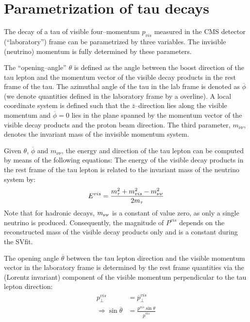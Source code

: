 \section{Parametrization of tau decays}
\label{sec:svParameterization}

The decay of a tau of visible four--momentum $p_{vis}$ measured in the CMS
detector (``laboratory'') frame can be parametrized by three variables.  The
invisible (neutrino) momentum is fully determined by these parameters.

The ``opening--angle'' $\theta$ is defined as the angle between the boost
direction of the tau lepton and the momentum vector of the visible decay
products in the rest frame of the tau.  The azimuthal angle of the tau in the
lab frame is denoted as $\overline{\phi}$ (we denote quantities defined in the
laboratory frame by a overline).  A local coordinate system is defined such that the
$\bar{z}$--direction lies along the visible momentum and $\overline{\phi} = 0$ lies
in the plane spanned by the momentum vector of the visible decay products and
the proton beam direction. The third parameter, $m_{\nu\nu}$, denotes the
invariant mass of the invisible momentum system.

Given $\theta$, $\overline{\phi}$ and $m_{\nu\nu}$, the energy and direction of the
tau lepton can be computed by means of the following equations: The energy of
the visible decay products in the rest frame of the tau lepton is related to the
invariant mass of the neutrino system by:
\begin{equation}
E^{vis} = \frac{m_\tau^2 + m_{vis}^2 - m_{\nu\nu}^2}{2m_\tau} 
\label{eq:restFrameMomentumRelation}
\end{equation}
Note that for hadronic decays, $m_{\nu\nu}$ is a constant of value zero, as only a
single neutrino is produced.  Consequently, the magnitude of $P^{vis}$ depends
on the reconstructed mass of the visible decay products only and is a constant
during the SVfit.

The opening angle $\overline{\theta}$ between the tau lepton direction and the
visible momentum vector in the laboratory frame is determined by the rest frame
quantities via the (Lorentz invariant) component of the visible momentum
perpendicular to the tau lepton direction:
\begin{align}
p^{vis}_{\perp} &= \overline p^{vis}_{\perp} \nonumber \\
\Rightarrow \sin \overline \theta &= \frac{p^{vis} \sin \theta}{\overline p^{vis}} 
\label{eq:labFrameOpeningAngle} 
\end{align}


